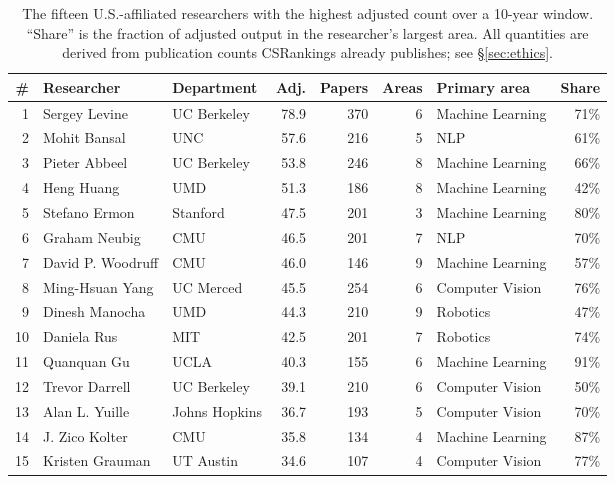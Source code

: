 \documentclass[11pt]{article}
\newcommand{\csr}{CSRankings}
\begin{document}
\begin{table}[t]
\centering
\small
\caption{The fifteen U.S.-affiliated researchers with the highest adjusted
count over a 10-year window. ``Share'' is the fraction of adjusted output in
the researcher's largest area. All quantities are derived from publication
counts \csr{} already publishes; see \S\ref{sec:ethics}.}
\label{tab:topresearchers}
\begin{tabular}{rllrrrlr}
\toprule
\# & Researcher & Department & Adj. & Papers & Areas & Primary area & Share \\
\midrule
1  & Sergey Levine     & UC Berkeley   & 78.9 & 370 & 6 & Machine Learning & 71\% \\
2  & Mohit Bansal      & UNC           & 57.6 & 216 & 5 & NLP              & 61\% \\
3  & Pieter Abbeel     & UC Berkeley   & 53.8 & 246 & 8 & Machine Learning & 66\% \\
4  & Heng Huang        & UMD           & 51.3 & 186 & 8 & Machine Learning & 42\% \\
5  & Stefano Ermon     & Stanford      & 47.5 & 201 & 3 & Machine Learning & 80\% \\
6  & Graham Neubig     & CMU           & 46.5 & 201 & 7 & NLP              & 70\% \\
7  & David P. Woodruff & CMU           & 46.0 & 146 & 9 & Machine Learning & 57\% \\
8  & Ming-Hsuan Yang   & UC Merced     & 45.5 & 254 & 6 & Computer Vision  & 76\% \\
9  & Dinesh Manocha    & UMD           & 44.3 & 210 & 9 & Robotics         & 47\% \\
10 & Daniela Rus       & MIT           & 42.5 & 201 & 7 & Robotics         & 74\% \\
11 & Quanquan Gu       & UCLA          & 40.3 & 155 & 6 & Machine Learning & 91\% \\
12 & Trevor Darrell    & UC Berkeley   & 39.1 & 210 & 6 & Computer Vision  & 50\% \\
13 & Alan L. Yuille    & Johns Hopkins & 36.7 & 193 & 5 & Computer Vision  & 70\% \\
14 & J. Zico Kolter    & CMU           & 35.8 & 134 & 4 & Machine Learning & 87\% \\
15 & Kristen Grauman   & UT Austin     & 34.6 & 107 & 4 & Computer Vision  & 77\% \\
\bottomrule
\end{tabular}
\end{table}
\end{document}
